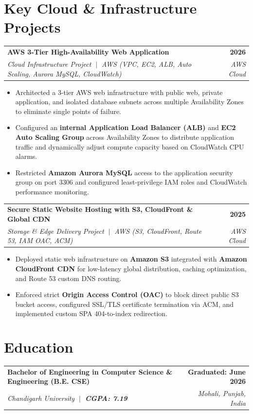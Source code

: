 \documentclass[letterpaper,9.8pt]{article}
\makeatletter
\newcommand{\resumeItemListStart}{\begin{itemize}[leftmargin=0.18in, labelsep=0.06in, itemsep=0.8pt, topsep=0.5pt, parsep=0pt, partopsep=0pt]}
\newcommand{\resumeItemListEnd}{\end{itemize}\vspace{2pt}}
\newcommand{\resumeProjectHeader}[4]{
  \vspace{1pt}
  \begin{tabular*}{1.0\textwidth}[t]{l@{\extracolsep{\fill}}r}
    \textbf{#1} & \textbf{\small #2} \\
    \textit{\small #3} & \textit{\small #4} \\
  \end{tabular*}\vspace{-3.5pt}
}
\newcommand{\resumeEduHeader}[4]{
  \vspace{1pt}
  \begin{tabular*}{1.0\textwidth}[t]{l@{\extracolsep{\fill}}r}
    \textbf{#1} & \textbf{\small #2} \\
    \textit{\small #3} & \textit{\small #4} \\
  \end{tabular*}\vspace{-3pt}
}
\makeatother
\begin{document}
\section{Key Cloud \& Infrastructure Projects}
\resumeProjectHeader{AWS 3-Tier High-Availability Web Application}{2026}{Cloud Infrastructure Project $\;\vert\;$ AWS (VPC, EC2, ALB, Auto Scaling, Aurora MySQL, CloudWatch)}{AWS Cloud}
\resumeItemListStart
  \item \small{Architected a 3-tier AWS web infrastructure with public web, private application, and isolated database subnets across multiple Availability Zones to eliminate single points of failure.}
  \item \small{Configured an \textbf{internal Application Load Balancer (ALB)} and \textbf{EC2 Auto Scaling Group} across Availability Zones to distribute application traffic and dynamically adjust compute capacity based on CloudWatch CPU alarms.}
  \item \small{Restricted \textbf{Amazon Aurora MySQL} access to the application security group on port 3306 and configured least-privilege IAM roles and CloudWatch performance monitoring.}
\resumeItemListEnd

\resumeProjectHeader{Secure Static Website Hosting with S3, CloudFront \& Global CDN}{2025}{Storage \& Edge Delivery Project $\;\vert\;$ AWS (S3, CloudFront, Route 53, IAM OAC, ACM)}{AWS Cloud}
\resumeItemListStart
  \item \small{Deployed static web infrastructure on \textbf{Amazon S3} integrated with \textbf{Amazon CloudFront CDN} for low-latency global distribution, caching optimization, and Route 53 custom DNS routing.}
  \item \small{Enforced strict \textbf{Origin Access Control (OAC)} to block direct public S3 bucket access, configured SSL/TLS certificate termination via ACM, and implemented custom SPA 404-to-index redirection.}
\resumeItemListEnd

\section{Education}
\resumeEduHeader{Bachelor of Engineering in Computer Science \& Engineering (B.E. CSE)}{Graduated: June 2026}{Chandigarh University $\;\vert\;$ \textbf{CGPA: 7.19}}{Mohali, Punjab, India}
\end{document}
